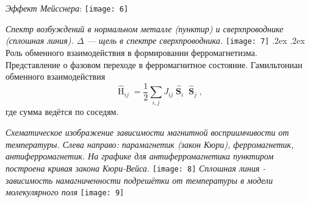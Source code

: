 \documentclass[10pt,landscape,a4paper]{article}
\makeatletter
\renewcommand{\section}{\@startsection{section}{1}{0mm}%
                                {.2ex}%
                                {.2ex}%
                                {\color{myblue}\sffamily\small\bfseries}}
\makeatother
\begin{document}
\begin{multicols}{5}
\emph{Эффект Мейсснера}:
	\texttt{[image: 6]}

	\emph{Спектр возбуждений в нормальном металле (пунктир) и сверхпроводнике (сплошная линия). $\Delta$ --- щель в спектре сверхпроводника.}
	\texttt{[image: 7]}
\section{Роль обменного взаимодействия в формировании ферромагнетизма. Представление о фазовом переходе в ферромагнитное состояние.}
Гамильтониан обменного взаимодействия
\[
	\widehat{\operatorname{H}}_{ij}= \frac{1}{2}\sum_{i,j}^{} J_{ij}\widehat{\operatorname{\mathbf{S}}}_i \widehat{\operatorname{\mathbf{S}}}_j
,\] 
где сумма ведётся по соседям.

\emph{Схематическое изображение зависимости магнитной восприимчивости от температуры. Слева направо: парамагнетик (закон Кюри), ферромагнетик, антиферромагнетик. На графике для антиферромагнетика пунктиром построена кривая закона Кюри-Вейса.}
	\texttt{[image: 8]}
\emph{Сплошная линия - зависимость намагниченности подрешётки от температуры в модели молекулярного поля}
	\texttt{[image: 9]}
\end{multicols}
\end{document}
